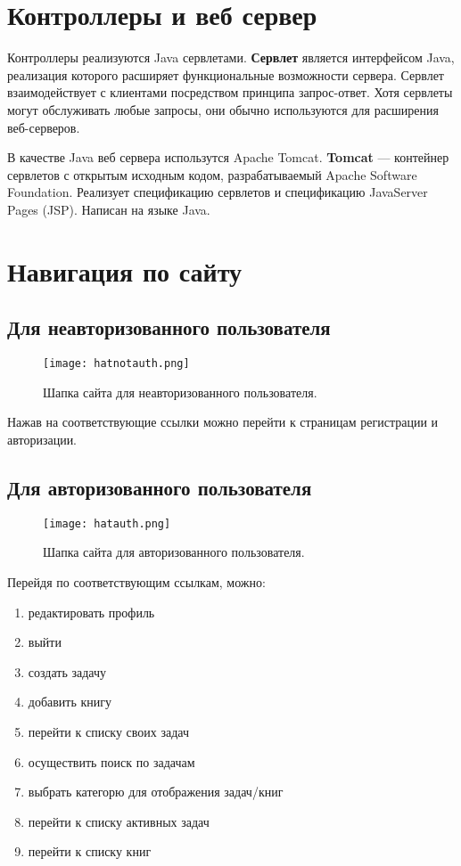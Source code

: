 \section{Контроллеры и веб сервер}

Контроллеры реализуются Java сервлетами. \textbf{Сервлет} является интерфейсом Java, реализация которого расширяет функциональные возможности сервера. Сервлет взаимодействует с клиентами посредством принципа запрос-ответ. Хотя сервлеты могут обслуживать любые запросы, они обычно используются для расширения веб-серверов.

В качестве Java веб сервера использутся Apache Tomcat. \textbf{Tomcat} — контейнер сервлетов с открытым исходным кодом, разрабатываемый Apache Software Foundation. Реализует спецификацию сервлетов и спецификацию JavaServer Pages (JSP). Написан на языке Java.



\section{Навигация по сайту} 

\subsection{Для неавторизованного пользователя} 

\begin{figure}[h]
  \centering
  \texttt{[image: hatnotauth.png]}
  \caption{ Шапка сайта для неавторизованного пользователя.}
\end{figure}

Нажав на соответствующие ссылки можно перейти к страницам регистрации и авторизации.

\subsection{Для авторизованного пользователя} 

\begin{figure}[h]
  \centering
  \texttt{[image: hatauth.png]}
  \caption{ Шапка сайта для авторизованного пользователя.}
\end{figure}

Перейдя по соответствующим ссылкам, можно:
\begin{enumerate}
\item редактировать профиль
\item выйти
\item создать задачу
\item добавить книгу
\item перейти к списку своих задач
\item осуществить поиск по задачам
\item выбрать категорю для отображения задач/книг
\item перейти к списку активных задач
\item перейти к списку книг
\end{enumerate}